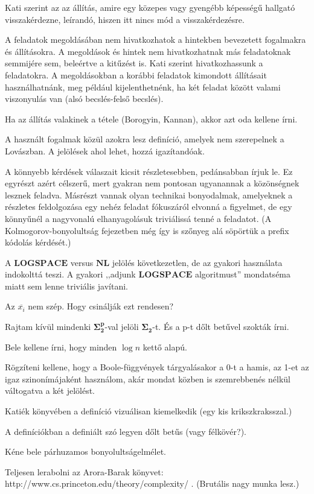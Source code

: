 \documentclass[11pt,a4paper,openany]{book}
\newcommand{\cl}[1]{\mbox{\ensuremath{\mathbf{#1}}}\xspace}
\newcommand{\LOGSPACE}{\cl{LOGSPACE}}
\newcommand{\NL}{\cl{NL}}
\newcommand{\Sigmatwo}{\cl{\Sigma_2}}
\newcommand{\la}[1]{\mbox{\sc{\MakeLowercase{#1}}}\xspace} %
\newcommand{\Language}{\la{L}} %
\begin{document}
Kati szerint az az állítás, amire egy közepes vagy gyengébb képességű hallgató visszakérdezne, leírandó, hiszen itt nincs mód a visszakérdezésre.

A feladatok megoldásában nem hivatkozhatok a hintekben bevezetett fogalmakra és állításokra. A megoldások és hintek nem hivatkozhatnak más feladatoknak semmijére sem, beleértve a kitűzést is. Kati szerint hivatkozhassunk a feladatokra. A megoldásokban a korábbi feladatok kimondott állításait használhatnánk, meg például kijelenthetnénk, ha két feladat között valami viszonyulás van (alsó becslés-felső becslés).

Ha az állítás valakinek a tétele (Borogyin, Kannan), akkor azt oda kellene írni.

A használt fogalmak közül azokra lesz definíció, amelyek nem szerepelnek a Lovászban. A jelölések ahol lehet, hozzá igazítandóak.

A könnyebb kérdések válaszait kicsit részletesebben, pedánsabban írjuk le. Ez egyrészt azért célszerű, mert gyakran nem pontosan ugyanannak a közönségnek lesznek feladva. Másrészt vannak olyan technikai bonyodalmak, amelyeknek a részletes feldolgozása egy nehéz feladat fókuszáról elvonná a figyelmet, de egy könnyűnél a nagyvonalú elhanyagolásuk triviálissá tenné a feladatot. (A Kolmogorov-bonyolultság fejezetben még így is szőnyeg alá söpörtük a prefix kódolás kérdését.)

A \LOGSPACE versus \NL jelölés következetlen, de az \Language gyakori használata indokolttá teszi. A gyakori ,,adjunk \LOGSPACE algoritmust'' mondatséma miatt sem lenne triviális javítani.

Az $\overline{x_i}$ nem szép. Hogy csinálják ezt rendesen?

Rajtam kívül mindenki {\cl{\Sigma^p_2}}-val jelöli \Sigmatwo-t. És a p-t dőlt betűvel szokták írni.

Bele kellene írni, hogy minden $\log n$ kettő alapú.

Rögzíteni kellene, hogy a Boole-függvények tárgyalásakor a 0-t a hamis, az 1-et az igaz szinonímájaként használom, akár mondat közben is szemrebbenés nélkül váltogatva a két jelölést.

Katiék könyvében a definíció vizuálisan kiemelkedik (egy kis krikszkraksszal.)

A definíciókban a definiált szó legyen dőlt betűs (vagy félkövér?).

Kéne bele párhuzamos bonyolultságelmélet.

Teljesen lerabolni az Arora-Barak könyvet: http://www.cs.princeton.edu/theory/complexity/ . (Brutális nagy munka lesz.)
\end{document}
